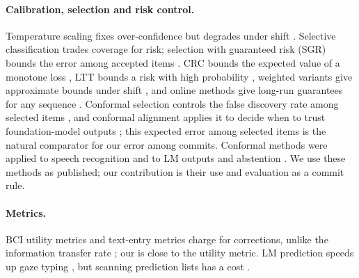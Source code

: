 \paragraph{Calibration, selection and risk control.} Temperature scaling fixes over-confidence \citep{guo2017calibration} but degrades under shift \citep{ovadia2019trust}. Selective classification trades coverage for risk; selection with guaranteed risk (SGR) bounds the error among accepted items \citep{geifman2017selective}. CRC bounds the expected value of a monotone loss \citep{angelopoulos2021gentle,angelopoulos2024crc}, LTT bounds a risk with high probability \citep{angelopoulos2025ltt}, weighted variants give approximate bounds under shift \citep{tibshirani2019covariate,barber2023beyond,farinhas2024nonexch}, and online methods give long-run guarantees for any sequence \citep{gibbs2021aci,gibbs2022online,angelopoulos2023pid,feldman2023rolling}. Conformal selection controls the false discovery rate among selected items \citep{jin2023selection}, and conformal alignment applies it to decide when to trust foundation-model outputs \citep{gui2024alignment}; this expected error among selected items is the natural comparator for our error among commits. Conformal methods were applied to speech recognition \citep{ernez2023conformal,damri2026risk} and to LM outputs and abstention \citep{quach2024conformal,mohri2024factuality,abbasiyadkori2024abstention}. We use these methods as published; our contribution is their use and evaluation as a commit rule.

\paragraph{Metrics.} BCI utility metrics \citep{dalseno2010utility} and text-entry metrics \citep{soukoreff2003metrics} charge for corrections, unlike the information transfer rate \citep{wolpaw2002bci}; our \ewpm{} is close to the utility metric. LM prediction speeds up gaze typing \citep{ward2000dasher,cai2024gaze}, but scanning prediction lists has a cost \citep{koester1994wordprediction}.
